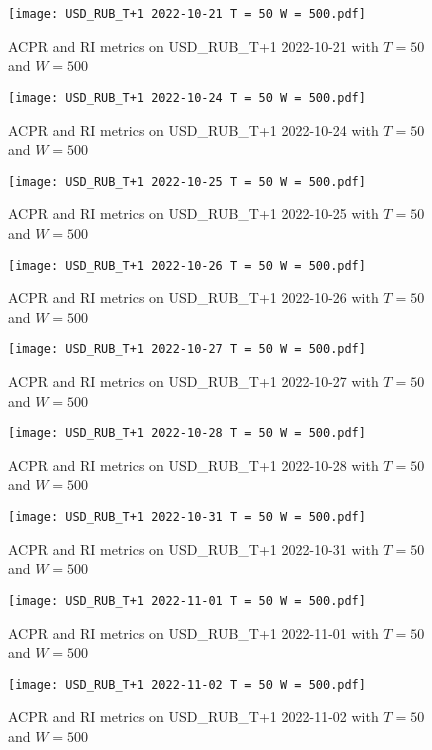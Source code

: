 \begin{figure}[htbp]
	\texttt{[image: USD\_RUB\_T+1 2022-10-21 T = 50 W = 500.pdf]}
	\caption{ACPR and RI metrics on USD\_RUB\_T+1 2022-10-21 with $T = 50$ and $W = 500$}
\end{figure}

\begin{figure}[htbp]
	\texttt{[image: USD\_RUB\_T+1 2022-10-24 T = 50 W = 500.pdf]}
	\caption{ACPR and RI metrics on USD\_RUB\_T+1 2022-10-24 with $T = 50$ and $W = 500$}
\end{figure}

\begin{figure}[htbp]
	\texttt{[image: USD\_RUB\_T+1 2022-10-25 T = 50 W = 500.pdf]}
	\caption{ACPR and RI metrics on USD\_RUB\_T+1 2022-10-25 with $T = 50$ and $W = 500$}
\end{figure}

\begin{figure}[htbp]
	\texttt{[image: USD\_RUB\_T+1 2022-10-26 T = 50 W = 500.pdf]}
	\caption{ACPR and RI metrics on USD\_RUB\_T+1 2022-10-26 with $T = 50$ and $W = 500$}
\end{figure}

\begin{figure}[htbp]
	\texttt{[image: USD\_RUB\_T+1 2022-10-27 T = 50 W = 500.pdf]}
	\caption{ACPR and RI metrics on USD\_RUB\_T+1 2022-10-27 with $T = 50$ and $W = 500$}
\end{figure}

\begin{figure}[htbp]
	\texttt{[image: USD\_RUB\_T+1 2022-10-28 T = 50 W = 500.pdf]}
	\caption{ACPR and RI metrics on USD\_RUB\_T+1 2022-10-28 with $T = 50$ and $W = 500$}
\end{figure}

\begin{figure}[htbp]
	\texttt{[image: USD\_RUB\_T+1 2022-10-31 T = 50 W = 500.pdf]}
	\caption{ACPR and RI metrics on USD\_RUB\_T+1 2022-10-31 with $T = 50$ and $W = 500$}
\end{figure}

\begin{figure}[htbp]
	\texttt{[image: USD\_RUB\_T+1 2022-11-01 T = 50 W = 500.pdf]}
	\caption{ACPR and RI metrics on USD\_RUB\_T+1 2022-11-01 with $T = 50$ and $W = 500$}
\end{figure}

\begin{figure}[htbp]
	\texttt{[image: USD\_RUB\_T+1 2022-11-02 T = 50 W = 500.pdf]}
	\caption{ACPR and RI metrics on USD\_RUB\_T+1 2022-11-02 with $T = 50$ and $W = 500$}
\end{figure}

